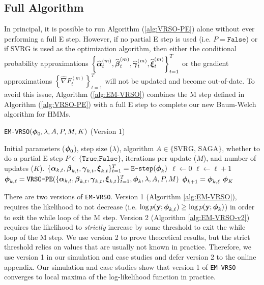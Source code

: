 \subsection{Full Algorithm}

In principal, it is possible to run Algorithm (\ref{alg:VRSO-PE}) alone without ever performing a full E step. However, if no partial E step is used (i.e. $P = \texttt{False}$) or if SVRG is used as the optimization algorithm, then either the conditional probability approximations $\left\{\widehat {\boldsymbol{\alpha}}_t^{(m)}, \widehat {\boldsymbol{\beta}}_t^{(m)}, \widehat {\boldsymbol{\gamma}}_t^{(m)}, \widehat {\boldsymbol{\xi}}_t^{(m)} \right\}_{t=1}^T$ or the gradient approximations $\left\{\widehat \nabla F_{t}^{(m)} \right\}_{t=1}^T$ will not be updated and become out-of-date. To avoid this issue, Algorithm (\ref{alg:EM-VRSO}) combines the M step defined in Algorithm (\ref{alg:VRSO-PE}) with a full E step to complete our new Baum-Welch algorithm for HMMs.

\begin{algorithm}
\caption{\texttt{EM-VRSO}$(\boldsymbol{\phi}_0,\lambda, A, P, M, K)$ (Version 1)}\label{alg:EM-VRSO}
\begin{algorithmic}[1]
\Require Initial parameters ($\boldsymbol{\phi}_{0}$), step size ($\lambda$), algorithm $A \in \{\text{SVRG, SAGA}\}$, whether to do a partial E step $P \in \{\texttt{True,False}\}$, iterations per update ($M$), and number of updates ($K$).
%
\vspace{5pt}
\vspace{5pt}
% 
\State $\{\boldsymbol{\alpha}_{k,t}, \boldsymbol{\beta}_{k,t}, \boldsymbol{\gamma}_{k,t}, \boldsymbol{\xi}_{k,t}\}_{t=1}^T = \texttt{E-step}(\boldsymbol{\phi}_{k})$ 
%
\vspace{5pt}
%
\State $\ell \gets 0$ 
%
%
\State $\ell \gets \ell+1$
\State $\boldsymbol{\phi}_{k,\ell} = \texttt{VRSO-PE}(\{\boldsymbol{\alpha}_{k,t}, \boldsymbol{\beta}_{k,t}, \boldsymbol{\gamma}_{k,t}, \boldsymbol{\xi}_{k,t}\}_{t=1}^T,\boldsymbol{\phi}_k,\lambda,A,P,M)$
%
\EndWhile
\State $\boldsymbol{\phi}_{k+1} = \boldsymbol{\phi}_{k,\ell}$
\EndFor
\State \Return $\boldsymbol{\phi}_K$
\end{algorithmic}
\end{algorithm}

There are two versions of \texttt{EM-VRSO}. Version 1 (Algorithm \ref{alg:EM-VRSO}), requires the likelihood to not decrease (i.e. $\log p(\mathbf{y};\boldsymbol{\phi}_{k,\ell}) \geq \log p(\mathbf{y};\boldsymbol{\phi}_{k})$) in order to exit the while loop of the M step. Version 2 (Algorithm \ref{alg:EM-VRSO-v2}) requires the likelihood to \textit{strictly} increase by some threshold to exit the while loop of the M step. We use version 2 to prove theoretical results, but the strict threshold relies on values that are usually not known in practice. Therefore, we use version 1 in our simulation and case studies and defer version 2 to the online appendix. Our simulation and case studies show that version 1 of \texttt{EM-VRSO} converges to local maxima of the log-likelihood function in practice. 

